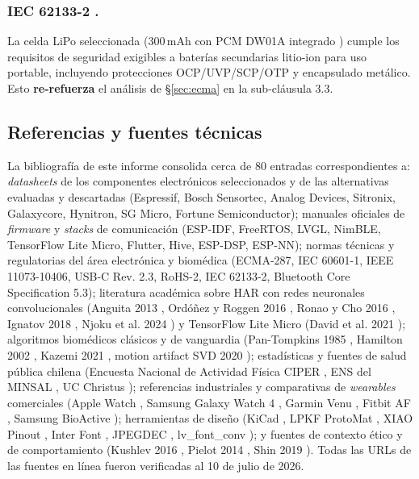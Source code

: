 \documentclass[letterpaper,11pt]{article}
\begin{document}
\subsubsection*{IEC 62133-2 \cite{en62133}.}
La celda LiPo seleccionada (300\,mAh con PCM DW01A integrado \cite{dw01a_ds}) cumple los requisitos de seguridad exigibles a bater\'ias secundarias litio-ion para uso portable, incluyendo protecciones OCP/UVP/SCP/OTP y encapsulado met\'alico. Esto \textbf{re-refuerza} el an\'alisis de \S\ref{sec:ecma} en la sub-cl\'ausula 3.3.

\subsection{Referencias y fuentes t\'ecnicas}

La bibliograf\'ia de este informe consolida cerca de $80$ entradas correspondientes a: \emph{datasheets} de los componentes electr\'onicos seleccionados y de las alternativas evaluadas y descartadas (Espressif, Bosch Sensortec, Analog Devices, Sitronix, Galaxycore, Hynitron, SG Micro, Fortune Semiconductor); manuales oficiales de \textit{firmware} y \textit{stacks} de comunicaci\'on (ESP-IDF, FreeRTOS, LVGL, NimBLE, TensorFlow Lite Micro, Flutter, Hive, ESP-DSP, ESP-NN); normas t\'ecnicas y regulatorias del \'area electr\'onica y biom\'edica (ECMA-287, IEC 60601-1, IEEE 11073-10406, USB-C Rev. 2.3, RoHS-2, IEC 62133-2, Bluetooth Core Specification 5.3); literatura acad\'emica sobre HAR con redes neuronales convolucionales (Anguita 2013 \cite{anguita2013}, Ord\'o\~nez y Roggen 2016 \cite{ordonez2016}, Ronao y Cho 2016 \cite{ronao2016}, Ignatov 2018 \cite{ignatov2018}, Njoku et al. 2024 \cite{har_tinyml}) y TensorFlow Lite Micro (David et al. 2021 \cite{david2021tflitemicro}); algoritmos biom\'edicos cl\'asicos y de vanguardia (Pan-Tompkins 1985 \cite{pan_tompkins}, Hamilton 2002 \cite{hamilton_2002}, Kazemi 2021 \cite{kazemi_cnn}, motion artifact SVD 2020 \cite{motion_artifact_svd}); estad\'isticas y fuentes de salud p\'ublica chilena (Encuesta Nacional de Actividad F\'isica CIPER \cite{encuesta_af}, ENS del MINSAL \cite{minsalwearables}, UC Christus \cite{obesidad_chile}); referencias industriales y comparativas de \textit{wearables} comerciales (Apple Watch \cite{apple_watch_compare}, Samsung Galaxy Watch 4 \cite{galaxy_watch4}, Garmin Venu \cite{garmin_venu}, Fitbit AF \cite{fitbit_afib}, Samsung BioActive \cite{samsung_bioactive}); herramientas de dise\~no (KiCad \cite{kicad}, LPKF ProtoMat \cite{lpkf_protomat}, XIAO Pinout \cite{xiao_esp32s3_pinout}, Inter Font \cite{inter_font}, JPEGDEC \cite{jpegdec_ref}, lv\_font\_conv \cite{lv_font_conv}); y fuentes de contexto \'etico y de comportamiento (Kushlev 2016 \cite{Kushlev2016}, Pielot 2014 \cite{Pielot2014}, Shin 2019 \cite{Shin2019}). Todas las URLs de las fuentes en l\'inea fueron verificadas al 10 de julio de 2026.
\end{document}
